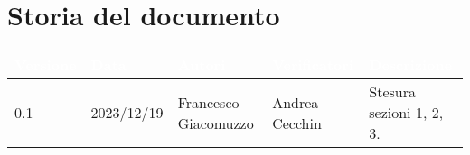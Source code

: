 \section{Storia del documento} \label{sec:storia}
\begingroup
\setlength{\tabcolsep}{10pt}
\renewcommand{\arraystretch}{1.5}
\begin{tabularx}{\textwidth}{| l | l | X | X | X |}
    \hline
    \rowcolor{headerrow} \textbf{\textcolor{white}{Versione}} & \textbf{\textcolor{white}{Data}} & \textbf{\textcolor{white}{Autori}} & \textbf{\textcolor{white}{Verificatori}} & \textbf{\textcolor{white}{Descrizione}} \\
    \hline
    0.1 & 2023/12/19 & Francesco Giacomuzzo & Andrea Cecchin & Stesura sezioni 1, 2, 3.\\
    \hline
    \end{tabularx}
\endgroup
